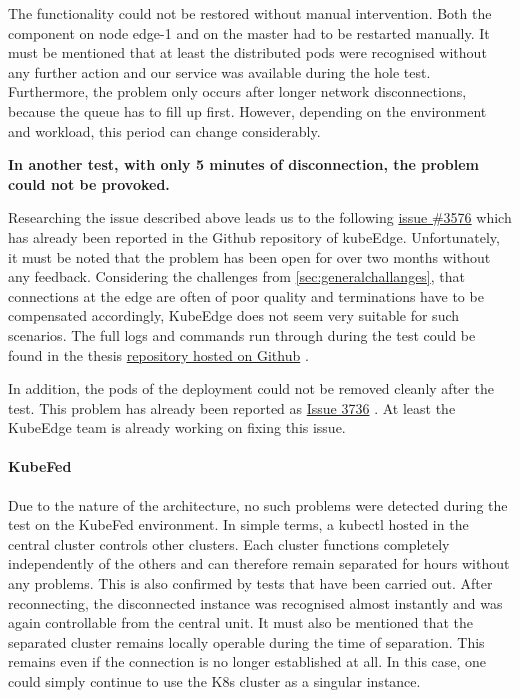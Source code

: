 \documentclass[MIC,Master,english]{twbook}%
\begin{document}
The functionality could not be restored without manual intervention. Both the component on node edge-1 and on the master had to be restarted manually. It must be mentioned that at least the distributed pods were recognised without any further action and our service was available during the hole test. Furthermore, the problem only occurs after longer network disconnections, because the queue has to fill up first. However, depending on the environment and workload, this period can change considerably.\par
\vspace{\baselineskip}
\textbf{In another test, with only 5 minutes of disconnection, the problem could not be provoked.}\par
\vspace{\baselineskip}
Researching the issue described above leads us to the following \hyperref{https://github.com/kubeedge/kubeedge/issues/3567}{}{}{issue \#3576}\cite{gh-ke-issue3567} which has already been reported in the Github repository of kubeEdge. Unfortunately, it must be noted that the problem has been open for over two months without any feedback. Considering the challenges from \autoref{sec:generalchallanges}, that connections at the edge are often of poor quality and terminations have to be compensated accordingly, KubeEdge does not seem very suitable for such scenarios. The full logs and commands run through during the test could be found in the thesis \hyperref{https://github.com/Berndinox/K8sEdge/blob/main/Tests/network/kubeedge-reconnect-issue.md}{}{}{repository hosted on Github} \cite{bk-gh-ke-reconnect}. \par

In addition, the pods of the deployment could not be removed cleanly after the test. This problem has already been reported as \hyperref{https://github.com/kubeedge/kubeedge/issues/3736
}{}{}{Issue 3736} \cite{ke-gh-issue3736}. At least the KubeEdge team is already working on fixing this issue.

\paragraph{KubeFed} Due to the nature of the architecture, no such problems were detected during the test on the KubeFed environment. In simple terms, a kubectl hosted in the central cluster controls other clusters. Each cluster functions completely independently of the others and can therefore remain separated for hours without any problems. This is also confirmed by tests that have been carried out. After reconnecting, the disconnected instance was recognised almost instantly and was again controllable from the central unit. It must also be mentioned that the separated cluster remains locally operable during the time of separation. This remains even if the connection is no longer established at all. In this case, one could simply continue to use the \ac{K8s} cluster as a singular instance.
\end{document}

